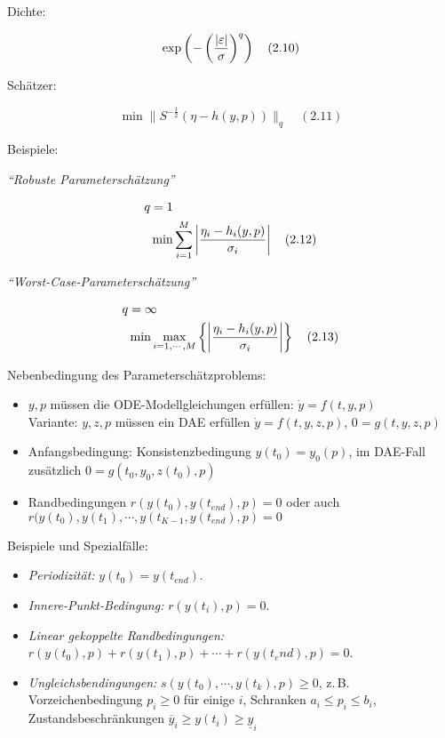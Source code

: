 Dichte:

\[\exp\left(-\left(\frac{|\varepsilon|}{\sigma}\right)^q\right) \quad (2.10)\]

Schätzer:

\[ \min \|S^{-\frac 12} (\eta-h(y,p)) \|_q \quad (2.11)\]

Beispiele:

\emph{"`Robuste Parameterschätzung"'}

\begin{align*}
q &= 1 \\
& \min \sum_{i=1}^M \left| \frac{\eta_i-h_i(y,p)}{\sigma_i} \right| \quad (2.12)
\end{align*}


\emph{"`Worst-Case-Parameterschätzung"'}

\begin{align*}
q &= \infty \\
& \min \max_{i=1,\cdots,M} \left\{ \left| \frac{\eta_i-h_i(y,p)}{\sigma_i} \right| \right\} \quad (2.13)
\end{align*}

Nebenbedingung des Parameterschätzproblems:

\begin{itemize}
\item $y,p$ müssen die ODE-Modellgleichungen erfüllen: $\dot y = f(t,y,p)$ \\
Variante: $y,z,p$ müssen ein DAE erfüllen $\dot y = f(t,y,z,p)$, $0=g(t,y,z,p)$
\item Anfangsbedingung: Konsistenzbedingung $y(t_0) = y_0(p)$, im DAE-Fall zusätzlich $0=g(t_0,y_0,z(t_0),p)$
\item Randbedingungen $r(y(t_0),y(t_{end}),p) = 0$ oder auch $r(y(t_0),y(t_1),\cdots,y(t_{K-1}, y(t_{end}),p) = 0$
\end{itemize}


Beispiele und Spezialfälle:

\begin{itemize}
\item \emph{Periodizität:} $y(t_0) = y(t_{end})$.
\item \emph{Innere-Punkt-Bedingung:} $r(y(t_i),p) = 0$.
\item \emph{Linear gekoppelte Randbedingungen:} $r(y(t_0),p) + r(y(t_1),p) + \cdots + r(y(t_end),p) = 0$.
\item \emph{Ungleichsbendingungen:} $s(y(t_0), \cdots, y(t_k), p) \geq 0$, z.\,B. Vorzeichenbedingung $p_i \geq 0$ für einige $i$, Schranken $a_i \leq p_i \leq b_i$, Zustandsbeschränkungen $\overline y_i \geq y(t_i) \geq \underline y_i$
\end{itemize}

